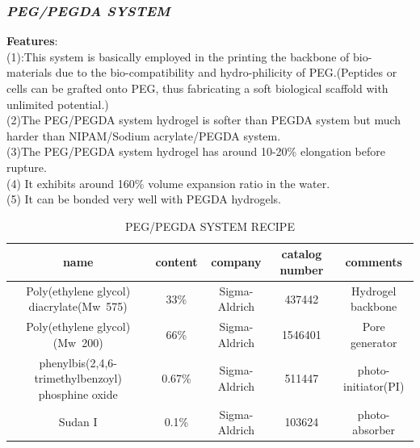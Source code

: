 \documentclass[a4paper]{article}
\begin{document}
\begin{itemize}
\subsubsection{\textit{PEG/PEGDA SYSTEM}}
\textbf{Features}:\\
(1):This system is basically employed in the printing the backbone of bio-materials due to the bio-compatibility and hydro-philicity of PEG.(Peptides or cells can be grafted onto PEG, thus fabricating a soft biological scaffold with unlimited potential.)\\
(2)The PEG/PEGDA system hydrogel is softer than PEGDA system but much harder than NIPAM/Sodium acrylate/PEGDA system.\\
(3)The PEG/PEGDA system hydrogel has around 10-20\% elongation before rupture.\\
(4) It exhibits around 160\% volume expansion ratio in the water.\\
(5) It can be bonded very well with PEGDA hydrogels.
\begin{table}[h!]
\caption{PEG/PEGDA SYSTEM RECIPE}
\begin{center}
    \begin{tabular}{ | c | c | c | c | c |}
    \hline
    \textbf{name}&\textbf{content}&\textbf{company}&\textbf{catalog number}&\textbf{comments} \\ \hline
    Poly(ethylene glycol) diacrylate(Mw~575)&33\%&Sigma-Aldrich&437442&Hydrogel backbone\\     \hline
    Poly(ethylene glycol)(Mw~200)&66\%&Sigma-Aldrich&1546401&Pore generator\\      \hline
    phenylbis(2,4,6-trimethylbenzoyl) phosphine                            oxide&0.67\%&Sigma-Aldrich&511447&photo-initiator(PI)\\
    \hline
    Sudan I&0.1\%&Sigma-Aldrich&103624&photo-absorber \\
    \hline
    \end{tabular}
\end{center}
\end{table}

\end{itemize}
\end{document}
